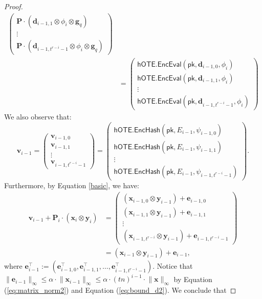 \documentclass{theoretics}
\newcommand{\BOTE}{\mathsf{hOTE}}
\newcommand{\algofont}[1]{\ensuremath{\mathsf{#1}}}
\newcommand{\Enc}{{\algofont{Enc}}}
\newcommand{\Eval}{\algofont{Eval}\xspace}
\newcommand{\Hash}{{\algofont{Hash}}}
\newcommand{\pk}{{\mathsf{pk}}}
\begin{document}
\begin{proof}
\begin{align*}
\begin{pmatrix}
\mathbf{P}\cdot (\mathbf{d}_{i-1,1}\otimes \phi_i\otimes \mathbf{g}_q)\\
\vdots\\
\mathbf{P}\cdot (\mathbf{d}_{i-1,t^{r-i}-1}\otimes \phi_i\otimes \mathbf{g}_q)
    \end{pmatrix}\\
    &=\begin{pmatrix} \BOTE.\Enc\Eval(\pk, \mathbf{d}_{i-1,0}, \phi_{i})\\
\BOTE.\Enc\Eval(\pk, \mathbf{d}_{i-1,1}, \phi_{i})\\
\vdots\\
\BOTE.\Enc\Eval(\pk, \mathbf{d}_{i-1,t^{r-i}-1}, \phi_{i})
    \end{pmatrix}\end{align*}
We also observe  that:
\[\mathbf{v}_{i-1}=\begin{pmatrix} \mathbf{v}_{i-1,0}\\
\mathbf{v}_{i-1,1}\\
\vdots\\
\mathbf{v}_{i-1,t^{r-i}-1}
    \end{pmatrix}=\begin{pmatrix} \BOTE.\Enc\Hash(\pk, E_{i-1}, \psi_{i-1,0})\\
\BOTE.\Enc\Hash(\pk, E_{i-1}, \psi_{i-1,1})\\
\vdots\\
\BOTE.\Enc\Hash(\pk, E_{i-1}, \psi_{i-1,t^{r-i}-1})
    \end{pmatrix}.\]
Furthermore, by Equation \eqref{basic}, we have:
\begin{align*}
    \mathbf{v}_{i-1}+\mathbf{P}_i\cdot(\mathbf{x}_{i}\otimes \mathbf{y}_i)&=\begin{pmatrix} (\mathbf{x}_{i-1,0}\otimes \mathbf{y}_{i-1})+\mathbf{e}_{i-1,0}\\
(\mathbf{x}_{i-1, 1}\otimes \mathbf{y}_{i-1})+\mathbf{e}_{i-1,1}\\
\vdots\\
(\mathbf{x}_{i-1, t^{r-i}}\otimes \mathbf{y}_{i-1})+\mathbf{e}_{i-1,t^{r-i}-1}
    \end{pmatrix}\\
    &=(\mathbf{x}_{i-1}\otimes \mathbf{y}_{i-1}) +\mathbf{e}_{i-1}, \end{align*}
 where $\mathbf{e}_{i-1}^\intercal:=(\mathbf{e}_{i-1,0}^\intercal, 
\mathbf{e}_{i-1,1}^\intercal, 
\dots, 
\mathbf{e}_{i-1,t^{r-i}-1}^\intercal)$.
Notice that $\lVert \mathbf{e}_{i-1}\rVert_\infty\le \alpha\cdot \lVert \mathbf{x}_{i-1}\rVert_\infty\le \alpha\cdot (tn)^{i-1}\cdot \lVert \mathbf{x}\rVert_\infty$ by Equation (\ref{eq:matrix_norm2}) and Equation (\ref{eq:bound_d2}). We conclude that

\end{proof}
\end{document}
